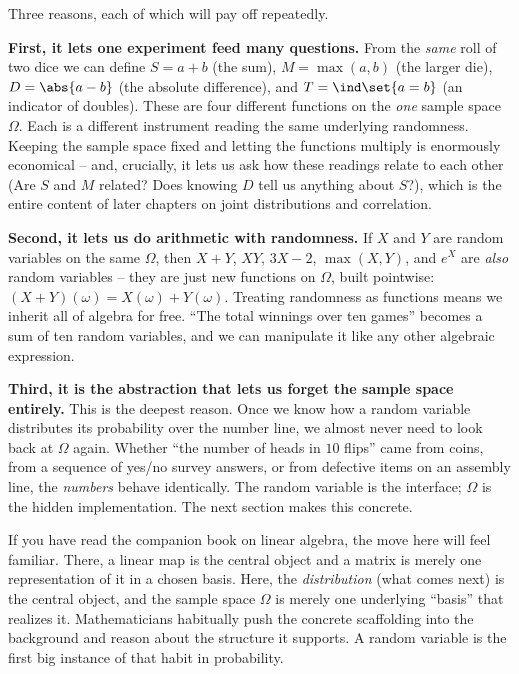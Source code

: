 Three reasons, each of which will pay off repeatedly.

\textbf{First, it lets one experiment feed many questions.} From the \emph{same} roll
of two dice we can define $S = a+b$ (the sum), $M = \max(a,b)$ (the larger die),
$D = \abs{a-b}$ (the absolute difference), and $T = \ind\set{a = b}$ (an indicator of
doubles). These are four different functions on the \emph{one} sample space $\Omega$.
Each is a different instrument reading the same underlying randomness. Keeping the
sample space fixed and letting the functions multiply is enormously economical -- and,
crucially, it lets us ask how these readings relate to each other (Are $S$ and $M$
related? Does knowing $D$ tell us anything about $S$?), which is the entire content of
later chapters on joint distributions and correlation.

\textbf{Second, it lets us do arithmetic with randomness.} If $X$ and $Y$ are random
variables on the same $\Omega$, then $X + Y$, $XY$, $3X - 2$, $\max(X,Y)$, and
$e^{X}$ are \emph{also} random variables -- they are just new functions on $\Omega$,
built pointwise: $(X+Y)(\omega) = X(\omega) + Y(\omega)$. Treating randomness as
functions means we inherit all of algebra for free. ``The total winnings over ten
games'' becomes a sum of ten random variables, and we can manipulate it like any other
algebraic expression.

\textbf{Third, it is the abstraction that lets us forget the sample space entirely.}
This is the deepest reason. Once we know how a random variable distributes its
probability over the number line, we almost never need to look back at $\Omega$ again.
Whether ``the number of heads in $10$ flips'' came from coins, from a sequence of
yes/no survey answers, or from defective items on an assembly line, the \emph{numbers}
behave identically. The random variable is the interface; $\Omega$ is the hidden
implementation. The next section makes this concrete.

\begin{connectionbox}
If you have read the companion book on linear algebra, the move here will feel
familiar. There, a linear map is the central object and a matrix is merely one
representation of it in a chosen basis. Here, the \emph{distribution} (what comes next)
is the central object, and the sample space $\Omega$ is merely one underlying ``basis''
that realizes it. Mathematicians habitually push the concrete scaffolding into the
background and reason about the structure it supports. A random variable is the first
big instance of that habit in probability.
\end{connectionbox}

